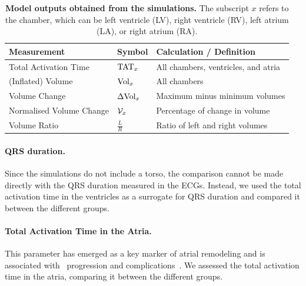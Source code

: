 \begin{table}[hbpt]
    \centering
    \caption{
        \textbf{Model outputs obtained from the simulations.}
        The subscript $x$ refers to the chamber, which can be left ventricle (LV),
        right ventricle (RV), left atrium (LA), or right atrium (RA). 
    }
    \vspace{1em}
    \begin{tabular}{lll}
    \hline
    Measurement              & Symbol                           & Calculation / Definition                                                                                  \\
    \hline
    Total Activation Time    & $\mathrm{TAT}_{x}$                        & All chambers, ventricles, and atria                                \\
    (Inflated) Volume        & $\mathrm{Vol}_{x}$                        & All chambers                                                     \\
    Volume Change            & $\Delta \mathrm{Vol}_{x}$                 & Maximum minus minimum volumes  \\
    Normalised Volume Change & $\mathcal{V}_{x}$            & Percentage of change in volume                  \\
    Volume Ratio             & $\frac{L}{R}$ & Ratio of left and right volumes \\                            
    \hline 
    \end{tabular}    
    \label{tab:measurements}
\end{table}

\paragraph{QRS duration.} 
Since the simulations do not include a torso, the comparison cannot be made directly 
with the QRS duration measured in the ECGs. 
Instead, we used the total activation time in the ventricles as a surrogate 
for QRS duration and compared it between the different groups.

\paragraph{Total Activation Time in the Atria.}
This parameter has emerged as a key marker of atrial remodeling and is associated with \HF\ 
progression and complications~\cite{sanders-2003-atrialremodelling,buck-2008-crt}.
We assessed the total activation time in the atria, comparing it between the different groups.

